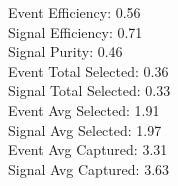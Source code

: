 Event  Efficiency:     0.56\\
Signal Efficiency:     0.71\\
Signal Purity:         0.46\\
Event  Total Selected: 0.36\\
Signal Total Selected: 0.33\\
Event  Avg Selected:   1.91\\
Signal Avg Selected:   1.97\\
Event  Avg Captured:   3.31\\
Signal Avg Captured:   3.63